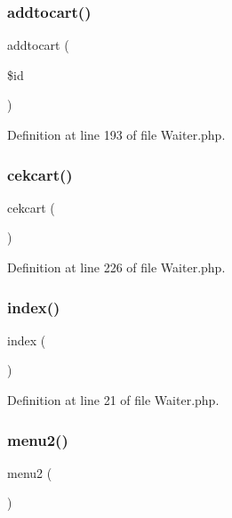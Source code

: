 \mbox{\label{class_waiter_ae739aac7ade34944585151952e9c523a}} 
\subsubsection{\texorpdfstring{addtocart()}{addtocart()}}
{\footnotesize\ttfamily addtocart (\begin{DoxyParamCaption}\item[{}]{\$id }\end{DoxyParamCaption})}



Definition at line 193 of file Waiter.\+php.

\mbox{\label{class_waiter_a4fe1079bf267b3b43db2d67e1c437e25}} 
\subsubsection{\texorpdfstring{cekcart()}{cekcart()}}
{\footnotesize\ttfamily cekcart (\begin{DoxyParamCaption}{ }\end{DoxyParamCaption})}



Definition at line 226 of file Waiter.\+php.

\mbox{\label{class_waiter_a149eb92716c1084a935e04a8d95f7347}} 
\subsubsection{\texorpdfstring{index()}{index()}}
{\footnotesize\ttfamily index (\begin{DoxyParamCaption}{ }\end{DoxyParamCaption})}



Definition at line 21 of file Waiter.\+php.

\mbox{\label{class_waiter_ad2c26cff98a5f9db6b4dec1edc8ada7b}} 
\subsubsection{\texorpdfstring{menu2()}{menu2()}}
{\footnotesize\ttfamily menu2 (\begin{DoxyParamCaption}{ }\end{DoxyParamCaption})}



